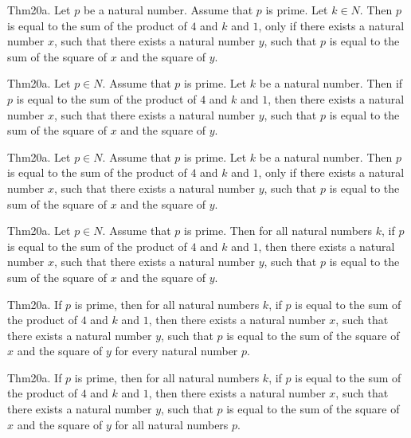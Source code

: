 \documentclass{article}
\begin{document}
Thm20a. Let $p$ be a natural number. Assume that $p$ is prime. Let $k \in N$. Then $p$ is equal to the sum of the product of $4$ and $k$ and $1$, only if there exists a natural number $x$, such that there exists a natural number $y$, such that $p$ is equal to the sum of the square of $x$ and the square of $y$.

Thm20a. Let $p \in N$. Assume that $p$ is prime. Let $k$ be a natural number. Then if $p$ is equal to the sum of the product of $4$ and $k$ and $1$, then there exists a natural number $x$, such that there exists a natural number $y$, such that $p$ is equal to the sum of the square of $x$ and the square of $y$.

Thm20a. Let $p \in N$. Assume that $p$ is prime. Let $k$ be a natural number. Then $p$ is equal to the sum of the product of $4$ and $k$ and $1$, only if there exists a natural number $x$, such that there exists a natural number $y$, such that $p$ is equal to the sum of the square of $x$ and the square of $y$.

Thm20a. Let $p \in N$. Assume that $p$ is prime. Then for all natural numbers $k$, if $p$ is equal to the sum of the product of $4$ and $k$ and $1$, then there exists a natural number $x$, such that there exists a natural number $y$, such that $p$ is equal to the sum of the square of $x$ and the square of $y$.

Thm20a. If $p$ is prime, then for all natural numbers $k$, if $p$ is equal to the sum of the product of $4$ and $k$ and $1$, then there exists a natural number $x$, such that there exists a natural number $y$, such that $p$ is equal to the sum of the square of $x$ and the square of $y$ for every natural number $p$.

Thm20a. If $p$ is prime, then for all natural numbers $k$, if $p$ is equal to the sum of the product of $4$ and $k$ and $1$, then there exists a natural number $x$, such that there exists a natural number $y$, such that $p$ is equal to the sum of the square of $x$ and the square of $y$ for all natural numbers $p$.
\end{document}
